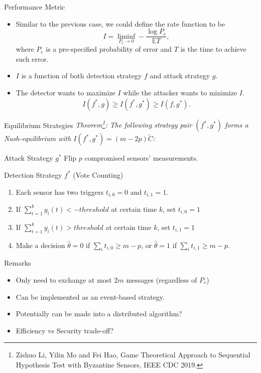 \documentclass[10pt]{beamer}
\begin{document}
  \begin{frame}{Performance Metric}
    \begin{itemize}
      \item Similar to the previous case, we could define the rate function to be
	\begin{displaymath}
	  I = \liminf_{P_e\rightarrow 0} -\frac{\log P_e}{\mathbb E T},
	\end{displaymath}
	where $P_e$ is a pre-specified probability of error and $T$ is the time to achieve such error.
      \item  $I$ is a function of both detection strategy $f$ and attack strategy $g$.
      \item The detector wants to maximize $I$ while the attacker wants to minimize $I$.
	\begin{displaymath}
	  I(f^*,g)\geq I(f^*,g^*) \geq I(f,g^*).	
	\end{displaymath}
    \end{itemize}  
  \end{frame}

  \begin{frame}{Equilibrium Strategies}
    \emph{Theorem\footnote{Zishuo Li, Yilin Mo and Fei Hao, Game Theoretical Approach to Sequential Hypothesis Test with Byzantine Sensors, IEEE CDC 2019.}: The following strategy pair $(f^*,g^*)$ forms a Nash-equilibrium with $I(f^*,g^*) = (m-2p)\tilde C$:}
    \begin{block}{Attack Strategy $g^*$}
      Flip $p$ compromised sensors' measurements.
    \end{block}
    \begin{block}{Detection Strategy $f^*$ (Vote Counting)}
      \begin{enumerate}
	\item Each sensor has two triggers $t_{i,0}=0$ and $t_{i,1}=1$.
	\item If $\sum_{t=1}^k y_i(t) < -threshold$ at certain time $k$, set $t_{i,0} = 1$
	\item If $\sum_{t=1}^k y_i(t) > threshold$ at certain time $k$, set $t_{i,1} = 1$
	\item Make a decision $\hat \theta = 0$ if $\sum_i t_{i,0} \geq m-p$, or $\hat \theta = 1$ if $\sum_i t_{i,1} \geq m-p$.
      \end{enumerate}
    \end{block}

  \end{frame}

  \begin{frame}{Remarks}
    \begin{itemize}
      \item Only need to exchange at most $2m$ messages (regardless of $P_e$)
      \item Can be implemented as an event-based strategy.
      \item Potentially can be made into a distributed algorithm?
      \item Efficiency vs Security trade-off?
    \end{itemize}
\end{frame}
\end{document}
